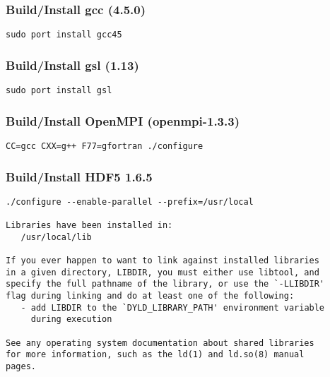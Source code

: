 \subsubsection{Build/Install gcc (4.5.0)}
\begin{footnotesize}
\begin{verbatim}
sudo port install gcc45
\end{verbatim}
\end{footnotesize}

\subsubsection{Build/Install gsl (1.13)}
\begin{footnotesize}
\begin{verbatim}
sudo port install gsl
\end{verbatim}
\end{footnotesize}

\subsubsection{Build/Install OpenMPI (openmpi-1.3.3)}
\begin{footnotesize}
\begin{verbatim}
CC=gcc CXX=g++ F77=gfortran ./configure
\end{verbatim}
\end{footnotesize}

\subsubsection{Build/Install HDF5 1.6.5}
\begin{footnotesize}
\begin{verbatim}
./configure --enable-parallel --prefix=/usr/local

Libraries have been installed in:
   /usr/local/lib

If you ever happen to want to link against installed libraries
in a given directory, LIBDIR, you must either use libtool, and
specify the full pathname of the library, or use the `-LLIBDIR'
flag during linking and do at least one of the following:
   - add LIBDIR to the `DYLD_LIBRARY_PATH' environment variable
     during execution

See any operating system documentation about shared libraries 
for more information, such as the ld(1) and ld.so(8) manual 
pages.
\end{verbatim}
\end{footnotesize}

